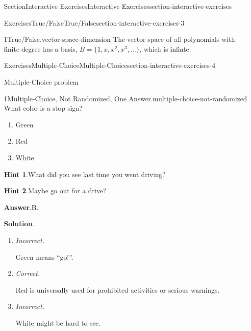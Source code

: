 \documentclass[twoside,10pt,]{article}
\newcommand{\blocktitlefont}{\relax}
\newcommand{\lititle}[1]{{\slshape#1}}
\numberwithin{equation}{section}
\begin{document}
\begin{sectionptx}{Section}{Interactive Exercises}{}{Interactive Exercises}{}{}{section-interactive-exercises}
\begin{exercises-subsection}{Exercises}{True\slash{}False}{}{True\slash{}False}{}{}{section-interactive-exercises-3}
\begin{divisionexercise}{1}{True\slash{}False.}{}{vector-space-dimension}
The vector space of all polynomials with finite degree has a basis, \(B = \{1,x,x^2,x^3,\dots\}\), which is infinte.%
\end{divisionexercise}%
\end{exercises-subsection}
%
%
\typeout{************************************************}
\typeout{************************************************}
%
\begin{exercises-subsection}{Exercises}{Multiple-Choice}{}{Multiple-Choice}{}{}{section-interactive-exercises-4}
\begin{introduction}{}%
Multiple-Choice problem%
\end{introduction}%
\begin{divisionexercise}{1}{Multiple-Choice, Not Randomized, One Answer.}{}{multiple-choice-not-randomized}%
%
What color is a stop sign?%
\par
%
\begin{enumerate}[label={\Alph*.}]
\item{}Green%
\item{}Red%
\item{}White%
\end{enumerate}
%
\par\smallskip%
\noindent\textbf{\blocktitlefont Hint 1}.\hypertarget{multiple-choice-not-randomized-4}{}\quad{}What did you see last time you went driving?%
\par\smallskip%
\noindent\textbf{\blocktitlefont Hint 2}.\hypertarget{multiple-choice-not-randomized-5}{}\quad{}Maybe go out for a drive?%
\par\smallskip%
\noindent\textbf{\blocktitlefont Answer}.\hypertarget{multiple-choice-not-randomized-6}{}\quad{}B.%
\par\smallskip%
\noindent\textbf{\blocktitlefont Solution}.\hypertarget{multiple-choice-not-randomized-7}{}\quad{}%
\begin{enumerate}[label={\Alph*.}]
\item{}\lititle{Incorrect.}\par%
Green means ``go!''.%
\item{}\lititle{Correct.}\par%
Red is universally used for prohibited activities or serious warnings.%
\item{}\lititle{Incorrect.}\par%
White might be hard to see.%
\end{enumerate}
%
\end{divisionexercise}%
\end{exercises-subsection}

\end{sectionptx}
\end{document}

